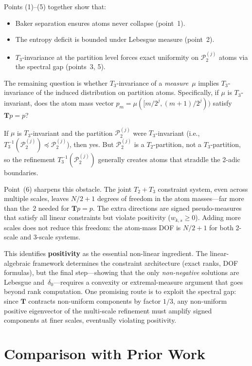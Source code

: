 \documentclass[11pt,a4paper]{article}
\begin{document}
Points (1)--(5) together show that:
\begin{itemize}
\item Baker separation ensures atoms never collapse (point~1).
\item The entropy deficit is bounded under Lebesgue measure (point~2).
\item $T_3$-invariance at the partition level forces exact uniformity on
  $\mathcal{P}_2^{(j)}$ atoms via the spectral gap (points~3, 5).
\end{itemize}

The remaining question is whether $T_3$-invariance of a \emph{measure}~$\mu$
implies $T_3$-invariance of the induced distribution on partition atoms.
Specifically, if $\mu$ is $T_3$-invariant, does the atom mass vector
$p_m = \mu([m/2^j, (m+1)/2^j))$ satisfy $\mathbf{T} p = p$?

If $\mu$ is $T_3$-invariant and the partition $\mathcal{P}_2^{(j)}$ were
$T_3$-invariant (i.e., $T_3^{-1}(\mathcal{P}_2^{(j)}) \preccurlyeq \mathcal{P}_2^{(j)}$),
then yes.  But $\mathcal{P}_2^{(j)}$ is a $T_2$-partition, not a $T_3$-partition,
so the refinement $T_3^{-1}(\mathcal{P}_2^{(j)})$ generally creates atoms
that straddle the 2-adic boundaries.

Point~(6) sharpens this obstacle.
The joint $T_2 + T_3$ constraint system, even across multiple scales,
leaves $N/2 + 1$ degrees of freedom in the atom masses---far more
than the~$2$ needed for $\mathbf{T}p = p$.
The extra directions are signed pseudo-measures that satisfy all
linear constraints but violate positivity ($w_{k,s} \ge 0$).
Adding more scales does not reduce this freedom: the atom-mass
DOF is $N/2 + 1$ for both 2-scale and 3-scale systems.

This identifies \textbf{positivity} as the essential non-linear ingredient.
The linear-algebraic framework determines the constraint architecture
(exact ranks, DOF formulas), but the final step---showing that
the only \emph{non-negative} solutions are Lebesgue and~$\delta_0$---requires
a convexity or extremal-measure argument that goes beyond rank computation.
One promising route is to exploit the spectral gap: since $\mathbf{T}$
contracts non-uniform components by factor $1/3$, any non-uniform
positive eigenvector of the multi-scale refinement must amplify
signed components at finer scales, eventually violating positivity.


\section{Comparison with Prior Work}
\end{document}
